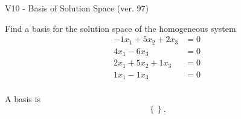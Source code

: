 \begin{exercise}
  \begin{exerciseTitle}V10 - Basis of Solution Space (ver. 97)\end{exerciseTitle}
  \begin{exerciseStatement}
    Find a basis for the solution space of the homogeneous system 
\begin{align*}
 -1 x_ 1 + 5 x_ 2 + 2 x_ 3 &= 0  \\ 
  4 x_ 1 -6 x_ 3 &= 0  \\ 
  2 x_ 1 + 5 x_ 2 + 1 x_ 3 &= 0  \\ 
  1 x_ 1 -1 x_ 3 &= 0  \\ 
 \end{align*}


 
  \end{exerciseStatement}

  \begin{exerciseAnswer}
   A basis is   
\[\left\{\right\}.\]

  


  \end{exerciseAnswer}
\end{exercise}